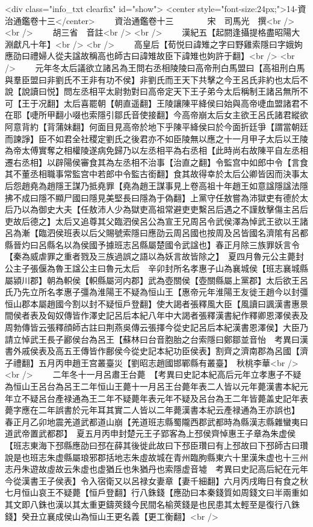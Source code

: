 <div class="info_txt clearfix" id="show">
<center style="font-size:24px;">14-資治通鑑卷十三</center>
  　　資治通鑑卷十三　　　　宋　司馬光　撰<br />
<br />
　　胡三省　音註<br />
<br />
　　漢紀五【起閼逢攝提格盡昭陽大淵獻凡十年】<br />
<br />
　　高皇后【荀悦曰諱雉之字曰野雞索隱曰字娥姁應劭曰禮婦人從夫諡故稱高也師古曰諱雉故臣下諱雉也姁許于翻】<br />
<br />
　　元年冬太后議欲立諸呂為王問右丞相陵陵曰高帝刑白馬盟曰【高祖刑白馬與羣臣盟曰非劉氏不王非有功不侯】非劉氏而王天下共擊之今王呂氏非約也太后不說【說讀曰悦】問左丞相平太尉勃對曰高帝定天下王子弟今太后稱制王諸呂無所不可【王于况翻】太后喜罷朝【朝直遥翻】王陵讓陳平絳侯曰始與高帝啑血盟諸君不在耶【啑所甲翻小啜也索隱引鄒氏音使接翻】今高帝崩太后女主欲王呂氏諸君縱欲阿意背約【背蒲妹翻】何面目見高帝於地下乎陳平絳侯曰於今面折廷爭【謂當朝廷而諫諍】臣不如君全社稷定劉氏之後君亦不如臣陵無以應之十一月甲子太后以王陵為帝太傅實奪之相權陵遂病免歸乃以左丞相平為右丞相【此時尚右故陳平自左丞相遷右丞相】以辟陽侯審食其為左丞相不治事【治直之翻】令監宫中如郎中令【言食其不董丞相職事常監宫中若郎中令監古銜翻】食其故得幸於太后公卿皆因而決事太后怨趙堯為趙隱王謀乃抵堯罪【堯為趙王謀事見上卷高祖十年趙王如意諡隱諡法隱拂不成曰隱不顯尸國曰隱見美堅長曰隱為于偽翻】上黨守任敖嘗為沛獄吏有德於太后乃以為御史大夫【任敖沛人少為獄吏高祖常避吏吏繫呂后遇之不謹敖擊傷主呂后吏故后德之】太后又追尊其父臨泗侯呂公為宣王兄周呂令武侯澤為悼武王欲以王諸呂為漸【臨泗侯班表以后父賜號索隱曰應劭云周呂國也按周及呂皆國名濟隂有呂都縣晉灼曰呂縣名以為侯國予據班志呂縣屬楚國令武諡也】春正月除三族罪妖言令【秦為威虐罪之重者戮及三族過誤之語以為妖言故皆除之】　夏四月魯元公主薨封公主子張偃為魯王諡公主曰魯元太后　辛卯封所名孝惠子山為襄城侯【班志襄城縣屬潁川郡】朝為軹侯【軹縣屬河内郡】武為壺關侯【壺關縣屬上黨郡】太后欲王呂氏乃先立所名孝惠子彊為淮陽王不疑為恒山王【惠帝元年淮陽王友徙王趙今以封彊恒山郡本屬趙國今割以封不疑恒戶登翻】使大謁者張釋風大臣【風讀曰諷漢書惠景間侯者表及匈奴傳皆作澤史記呂后本紀八年中大謁者張釋漢書紀作釋卿恩澤侯表及周勃傳皆云張釋顔師古註曰荆燕吳傳云張擇今從史記呂后本紀漢書恩澤侯】大臣乃請立悼武王長子酈侯台為呂王【蘇林曰台音胞胎之台索隱曰鄭鄒並音怡　考異曰漢書外戚侯表及高五王傳皆作鄜侯今從史記本紀功臣侯表】割齊之濟南郡為呂國【濟子禮翻】五月丙申趙王宫叢臺災【劉昭志趙國邯鄲縣有叢臺】　秋桃李華<br />
<br />
　　二年冬十一月呂肅王台薨　【考異曰史記本紀高后元年立孝惠子不疑為恒山王呂台為呂王二年恒山王薨十一月呂王台薨年表二人皆以元年薨漢書本紀元年立不疑呂台產禄通為王二年不疑薨年表元年不疑及呂台為王二年皆薨盖史記年表薨字應在二年誤書於元年耳其實二人皆以二年薨漢書本紀云產禄通為王亦誤也】　春正月乙卯地震羌道武都道山崩【羌道班志縣蜀隴西郡武都時為縣漢志縣雜蠻夷曰道武帝置武都郡】　夏五月丙申封楚元王子郢客為上邳侯齊悼惠王子章為朱虚侯【班志東海下邳縣應劭曰邳在薛其後徙此故曰下邳臣瓚曰有上邳故曰下邳師古曰瓚說是也班志朱虚縣屬琅邪郡括地志朱虛故城在青州臨朐縣東六十里漢朱虚也十三州志丹朱遊故虛故云朱虚也虚猶丘也朱猶丹也索隱虚音墟　考異曰史記高后紀在元年今從漢書王子侯表】令入宿衛又以呂禄女妻章【妻千細翻】六月丙戌晦日有食之秋七月恒山哀王不疑薨【恒戶登翻】行八銖錢【應劭曰本秦錢質如周錢文曰半兩重如其文即八銖也漢以其太重更鑄莢錢今民間名榆莢錢是也民患其太輕至是復行八銖錢】癸丑立襄成侯山為恒山王更名義【更工衡翻】<br />
